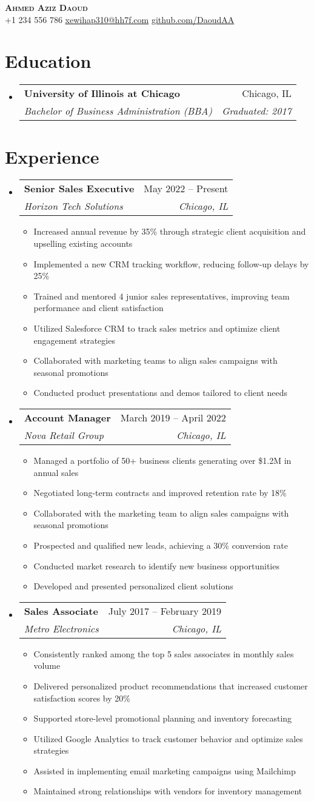 \documentclass[letterpaper,11pt]{article}
\makeatletter
\newcommand{\resumeItem}[1]{
    \item\small{
            {#1 \vspace{-2pt}}
    }
}
\newcommand{\resumeSubheading}[4]{
    \vspace{-2pt}\item
    \begin{tabular*}{0.97\textwidth}[t]{l@{\extracolsep{\fill}}r}
    \textbf{#1} & #2 \\
    \textit{\small#3} & \textit{\small #4} \\
    \end{tabular*}\vspace{-7pt}
}
\newcommand{\resumeSubHeadingListStart}{\begin{itemize}[leftmargin=0.15in, label={}]}
\newcommand{\resumeSubHeadingListEnd}{\end{itemize}}
\newcommand{\resumeItemListStart}{\begin{itemize}}
\newcommand{\resumeItemListEnd}{\end{itemize}\vspace{-5pt}}
\makeatother
\begin{document}
\begin{center}
\textbf{\Huge \scshape Ahmed Aziz Daoud} \\ \vspace{1pt}
\small
+1 234 556 786 \quad
\href{mailto:xewihap310@hh7f.com}{xewihap310@hh7f.com} \quad
\href{https://github.com/DaoudAA}{github.com/DaoudAA}
\end{center}

\vspace{20pt}
\section{Education}
\resumeSubHeadingListStart
\resumeSubheading
{University of Illinois at Chicago}{Chicago, IL}
{Bachelor of Business Administration (BBA)}{Graduated: 2017}
\resumeSubHeadingListEnd

\section{Experience}
\resumeSubHeadingListStart
\resumeSubheading
{Senior Sales Executive}{May 2022 – Present}
{Horizon Tech Solutions}{Chicago, IL}
\resumeItemListStart
\resumeItem{Increased annual revenue by 35\% through strategic client acquisition and upselling existing accounts}
\resumeItem{Implemented a new CRM tracking workflow, reducing follow-up delays by 25\%}
\resumeItem{Trained and mentored 4 junior sales representatives, improving team performance and client satisfaction}
\resumeItem{Utilized Salesforce CRM to track sales metrics and optimize client engagement strategies}
\resumeItem{Collaborated with marketing teams to align sales campaigns with seasonal promotions}
\resumeItem{Conducted product presentations and demos tailored to client needs}
\resumeItemListEnd
\resumeSubheading
{Account Manager}{March 2019 – April 2022}
{Nova Retail Group}{Chicago, IL}
\resumeItemListStart
\resumeItem{Managed a portfolio of 50+ business clients generating over \$1.2M in annual sales}
\resumeItem{Negotiated long-term contracts and improved retention rate by 18\%}
\resumeItem{Collaborated with the marketing team to align sales campaigns with seasonal promotions}
\resumeItem{Prospected and qualified new leads, achieving a 30\% conversion rate}
\resumeItem{Conducted market research to identify new business opportunities}
\resumeItem{Developed and presented personalized client solutions}
\resumeItemListEnd
\resumeSubheading
{Sales Associate}{July 2017 – February 2019}
{Metro Electronics}{Chicago, IL}
\resumeItemListStart
\resumeItem{Consistently ranked among the top 5 sales associates in monthly sales volume}
\resumeItem{Delivered personalized product recommendations that increased customer satisfaction scores by 20\%}
\resumeItem{Supported store-level promotional planning and inventory forecasting}
\resumeItem{Utilized Google Analytics to track customer behavior and optimize sales strategies}
\resumeItem{Assisted in implementing email marketing campaigns using Mailchimp}
\resumeItem{Maintained strong relationships with vendors for inventory management}
\resumeItemListEnd
\resumeSubHeadingListEnd
\end{document}
